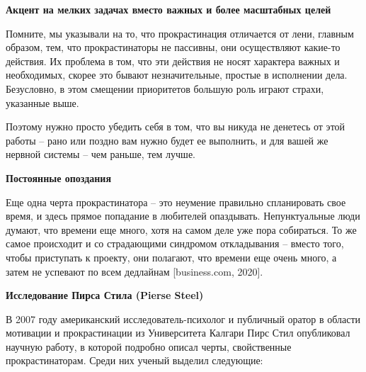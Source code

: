 \textbf{Акцент на мелких задачах вместо важных и более масштабных целей}

Помните, мы указывали на то, что прокрастинация отличается от лени, главным образом, тем, что прокрастинаторы не пассивны, они осуществляют какие-то действия. Их проблема в том, что эти действия не носят характера важных и необходимых, скорее это бывают незначительные, простые в исполнении дела. Безусловно, в этом смещении приоритетов большую роль играют страхи, указанные выше.

Поэтому нужно просто убедить себя в том, что вы никуда не денетесь от этой работы – рано или поздно вам нужно будет ее выполнить, и для вашей же нервной системы – чем раньше, тем лучше.

\textbf{Постоянные опоздания}

Еще одна черта прокрастинатора – это неумение правильно спланировать свое время, и здесь прямое попадание в любителей опаздывать. Непунктуальные люди думают, что времени еще много, хотя на самом деле уже пора собираться. То же самое происходит и со страдающими синдромом откладывания – вместо того, чтобы приступать к проекту, они полагают, что времени еще очень много, а затем не успевают по всем дедлайнам [business.com, 2020].

\textbf{Исследование Пирса Стила (Pierse Steel)}

В 2007 году американский исследователь-психолог и публичный оратор в области мотивации и прокрастинации из Университета Калгари Пирс Стил опубликовал научную работу, в которой подробно описал черты, свойственные прокрастинаторам. Среди них ученый выделил следующие:

